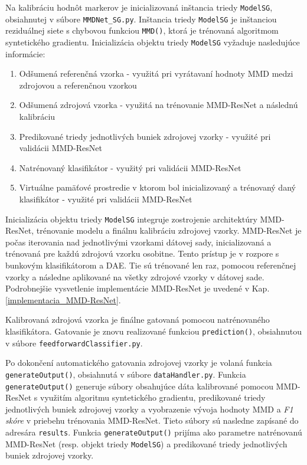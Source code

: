 Na kalibráciu hodnôt markerov je inicializovaná inštancia triedy \texttt{ModelSG}, obsiahnutej v súbore \texttt{MMDNet_SG.py}. Inštancia triedy \texttt{ModelSG} je inštanciou reziduálnej siete s chybovou funkciou \texttt{MMD()}, ktorá je trénovaná algoritmom syntetického gradientu. Inicializácia objektu triedy \texttt{ModelSG} vyžaduje nasledujúce informácie:
\begin{enumerate}
    \item Odšumená referenčná vzorka - využitá pri vyrátavaní hodnoty MMD medzi zdrojovou a referenčnou vzorkou
    \item Odšumená zdrojová vzorka - využitá na trénovanie MMD-ResNet a následnú kalibráciu
    \item Predikované triedy jednotlivých buniek zdrojovej vzorky - využité pri validácii MMD-ResNet
    \item Natrénovaný klasifikátor - využitý pri validácii MMD-ResNet
    \item Virtuálne pamäťové prostredie v ktorom bol inicializovaný a trénovaný daný klasifikátor - využité pri validácii MMD-ResNet
\end{enumerate}
Inicializácia objektu triedy \texttt{ModelSG} integruje zostrojenie architektúry MMD-ResNet, trénovanie modelu a finálnu kalibráciu zdrojovej vzorky. MMD-ResNet je počas iterovania nad jednotlivými vzorkami dátovej sady, inicializovaná a trénovaná pre každú zdrojovú vzorku osobitne. Tento prístup je v rozpore s bunkovým klasifikátorom a DAE. Tie sú trénované len raz, pomocou referenčnej vzorky a následne aplikované na všetky zdrojové vzorky v dátovej sade. Podrobnejšie vysvetlenie implementácie MMD-ResNet je uvedené v Kap. \ref{implementacia_MMD-ResNet}.

Kalibrovaná zdrojová vzorka je finálne gatovaná pomocou natrénovaného klasifikátora. Gatovanie je znovu realizované funkciou \texttt{prediction()}, obsiahnutou v súbore \texttt{feedforwardClassifier.py}.

Po dokončení automatického gatovania zdrojovej vzorky je volaná funkcia \texttt{generateOutput()}, obsiahnutá v súbore \texttt{dataHandler.py}. Funkcia \texttt{generateOutput()} generuje súbory obsahujúce dáta kalibrované pomocou MMD-ResNet s využitím algoritmu syntetického gradientu, predikované triedy jednotlivých buniek zdrojovej vzorky a vyobrazenie vývoja hodnoty MMD a \textit{F1 skóre} v priebehu trénovania MMD-ResNet. Tieto súbory sú nasledne zapísané do adresára \texttt{results}. Funkcia \texttt{generateOutput()} prijíma ako parametre natrénovanú MMD-ResNet (resp. objekt triedy \texttt{ModelSG}) a predikované triedy jednotlivých buniek zdrojovej vzorky.

